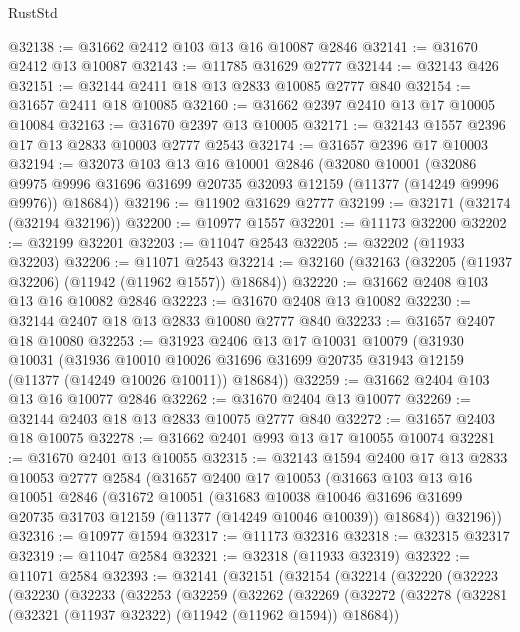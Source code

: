 \begin{lexlean}{RustStd}
\begin{coremodule}
@32138 := @31662 @2412 @103 @13 @16 @10087 @2846
@32141 := @31670 @2412 @13 @10087
@32143 := @11785 @31629 @2777
@32144 := @32143 @426
@32151 := @32144 @2411 @18 @13 @2833 @10085 @2777 @840
@32154 := @31657 @2411 @18 @10085
@32160 := @31662 @2397 @2410 @13 @17 @10005 @10084
@32163 := @31670 @2397 @13 @10005
@32171 := @32143 @1557 @2396 @17 @13 @2833 @10003 @2777 @2543
@32174 := @31657 @2396 @17 @10003
@32194 := @32073
    @103
    @13
    @16
    @10001
    @2846
    (@32080
      @10001
      (@32086 @9975 @9996 @31696 @31699 @20735 @32093 @12159 (@11377 (@14249 @9996 @9976)) @18684))
@32196 := @11902 @31629 @2777
@32199 := @32171 (@32174 (@32194 @32196))
@32200 := @10977 @1557
@32201 := @11173 @32200
@32202 := @32199 @32201
@32203 := @11047 @2543
@32205 := @32202 (@11933 @32203)
@32206 := @11071 @2543
@32214 := @32160 (@32163 (@32205 (@11937 @32206) (@11942 (@11962 @1557)) @18684))
@32220 := @31662 @2408 @103 @13 @16 @10082 @2846
@32223 := @31670 @2408 @13 @10082
@32230 := @32144 @2407 @18 @13 @2833 @10080 @2777 @840
@32233 := @31657 @2407 @18 @10080
@32253 := @31923
    @2406
    @13
    @17
    @10031
    @10079
    (@31930
      @10031
      (@31936
        @10010
        @10026
        @31696
        @31699
        @20735
        @31943
        @12159
        (@11377 (@14249 @10026 @10011))
        @18684))
@32259 := @31662 @2404 @103 @13 @16 @10077 @2846
@32262 := @31670 @2404 @13 @10077
@32269 := @32144 @2403 @18 @13 @2833 @10075 @2777 @840
@32272 := @31657 @2403 @18 @10075
@32278 := @31662 @2401 @993 @13 @17 @10055 @10074
@32281 := @31670 @2401 @13 @10055
@32315 := @32143
    @1594
    @2400
    @17
    @13
    @2833
    @10053
    @2777
    @2584
    (@31657
      @2400
      @17
      @10053
      (@31663
        @103
        @13
        @16
        @10051
        @2846
        (@31672
          @10051
          (@31683
            @10038
            @10046
            @31696
            @31699
            @20735
            @31703
            @12159
            (@11377 (@14249 @10046 @10039))
            @18684))
        @32196))
@32316 := @10977 @1594
@32317 := @11173 @32316
@32318 := @32315 @32317
@32319 := @11047 @2584
@32321 := @32318 (@11933 @32319)
@32322 := @11071 @2584
@32393 := @32141
    (@32151
      (@32154
        (@32214
          (@32220
            (@32223
              (@32230
                (@32233
                  (@32253
                    (@32259
                      (@32262
                        (@32269
                          (@32272
                            (@32278
                              (@32281 (@32321 (@11937 @32322) (@11942 (@11962 @1594)) @18684))

\end{coremodule}
\end{lexlean}
